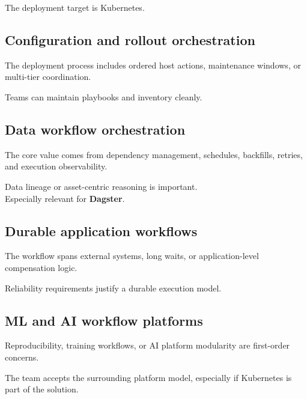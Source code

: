 \documentclass[11pt]{article}
\newcommand{\checkbox}{\makebox[1.6em][l]{\(\square\)}}
\newcommand{\tool}[1]{\textbf{#1}}
\begin{document}
\checkbox The deployment target is Kubernetes.\cite{ArgoCDHome}

\subsection{Configuration and rollout orchestration}
\checkbox The deployment process includes ordered host actions, maintenance windows, or multi-tier coordination.\cite{AnsibleRolling}

\checkbox Teams can maintain playbooks and inventory cleanly.\cite{AnsiblePlaybooks}

\subsection{Data workflow orchestration}
\checkbox The core value comes from dependency management, schedules, backfills, retries, and execution observability.\cite{AirflowHome,PrefectQuickstart,DagsterOverview}

\checkbox Data lineage or asset-centric reasoning is important.\\
\hspace*{1.2em}Especially relevant for \tool{Dagster}.\cite{DagsterOverview}

\subsection{Durable application workflows}
\checkbox The workflow spans external systems, long waits, or application-level compensation logic.\cite{TemporalWhatIs,TemporalUnderstanding}

\checkbox Reliability requirements justify a durable execution model.\cite{TemporalWhatIs}

\subsection{ML and AI workflow platforms}
\checkbox Reproducibility, training workflows, or AI platform modularity are first-order concerns.\cite{FlyteOSS,KubeflowIntro,MetaflowWhatIs}

\checkbox The team accepts the surrounding platform model, especially if Kubernetes is part of the solution.\cite{FlyteOSS,KubeflowIntro}
\end{document}
